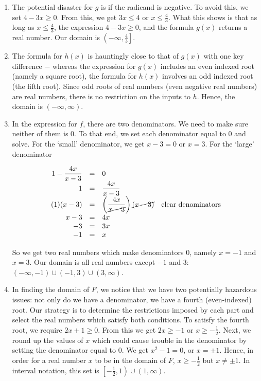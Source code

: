 {
\begin{enumerate}


\item  The potential disaster for $g$ is if the radicand is negative.  To avoid this, we set $4 - 3x \geq 0$. From this, we get $3x \leq 4$ or $x \leq \frac{4}{3}$.  What this shows is that as long as $x \leq \frac{4}{3}$, the expression $4 - 3x \geq 0$, and the formula $g(x)$ returns a real number.  Our domain is $\left(-\infty, \frac{4}{3}\right]$.

\item  The formula for $h(x)$ is hauntingly close to that of $g(x)$ with one key difference $-$ whereas the expression for $g(x)$ includes an even indexed root (namely a square root), the formula for $h(x)$ involves an odd indexed root (the fifth root).  Since odd roots of real numbers (even negative real numbers) are real numbers, there is no restriction on the inputs to $h$.  Hence, the domain is $(-\infty, \infty)$.


\item  In the expression for $f$, there are two denominators.  We need to make sure neither of them is $0$.  To that end, we set each denominator equal to $0$ and solve.  For the `small' denominator, we get $x - 3 = 0$ or $x=3$.  For the `large' denominator

\setlength{\extrarowheight}{10pt}

\[ \begin{array}{rclr}  
1 - \dfrac{4x}{x-3} & = & 0  & \\
                  1 & = & \dfrac{4x}{x-3} & \\ 
           (1)(x-3) & = & \left(\dfrac{4x}{\cancel{x-3}}\right)\cancel{(x-3)} & \mbox{clear denominators}  \\
              x - 3 & = &  4x & \\
                 -3 & = & 3x \\
                 -1 & = & x 
\end{array} \]

\setlength{\extrarowheight}{2pt} 
So we get two real numbers which make denominators $0$, namely $x = -1$ and $x=3$.  Our domain is all real numbers except $-1$ and $3$:  $(-\infty, -1) \cup (-1,3) \cup (3, \infty)$.

\drawexampleline

\item  In finding the domain of $F$, we notice that we have two potentially hazardous issues:  not only do we have a denominator, we have a fourth (even-indexed) root.  Our strategy is to determine the restrictions imposed by each part and select the real numbers which satisfy both conditions.  To satisfy the fourth root,  we require $2x+1 \geq 0$.  From this we get $2x \geq -1$ or $x \geq -\frac{1}{2}$.  Next, we round up the values of $x$ which could cause trouble in the denominator by setting the denominator equal to $0$.  We get $x^2 - 1=0$, or $x = \pm 1$.  Hence, in order for a real number $x$ to be in the domain of $F$, $x \geq -\frac{1}{2}$ but $x \neq \pm 1$.  In interval notation, this set is $\left[ -\frac{1}{2}, 1 \right) \cup (1, \infty)$. 


\end{enumerate}}
